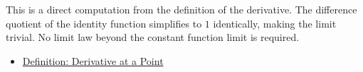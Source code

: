 \begin{remark*}
This is a direct computation from the definition of the derivative. The difference quotient of the identity function simplifies to $1$ identically, making the limit trivial. No limit law beyond the constant function limit is required.
\end{remark*}

\begin{dependencies}
\begin{itemize}
  \item \hyperref[def:derivative-at-a-point]{Definition: Derivative at a Point}
\end{itemize}
\end{dependencies}

\clearpage
